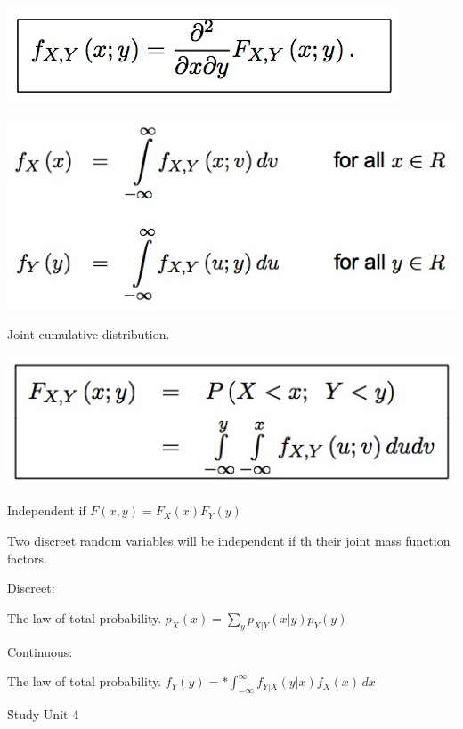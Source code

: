 \documentclass{examnotes}
\begin{document}
{\includegraphics[scale=0.4]{./img/3con2.jpg}                                         

\includegraphics[scale=0.4]{./img/3con3.jpg}                                         


Joint cumulative distribution.

\includegraphics[scale=0.4]{./img/3con4.jpg}                                         



Independent if $F(x,y)=F_X(x)F_Y(y)$

Two discreet random variables will be independent if th their joint mass function factors.


Discreet:

The law of total probability. $p_X(x)=\displaystyle\sum_y{p_{X|Y}(x|y)p_Y(y)}$

Continuous:

The law of total probability. $f_Y(y)=*\int_{-\infty}^\infty{f_{Y|X}(y|x)f_X(x)\,dx}$


\h{Study Unit 4}

}
\end{document}
